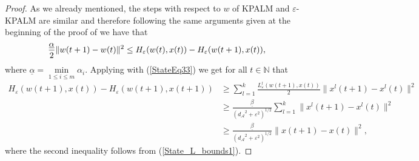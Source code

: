 \documentclass[11pt]{article}
\numberwithin{equation}{section}
\begin{document}
\begin{proof}
As we already mentioned, the steps with respect to $w$ of KPALM and $\varepsilon$-KPALM  are similar and therefore following the same arguments given at the beginning of the proof of  we have that
\begin{equation}
	\frac{\underline{\alpha}}{2} \|w(t+1) - w(t)\|^2 \leq H_{\varepsilon}(w(t),x(t)) - H_{\varepsilon}(w(t+1),x(t)) , \\ \label{StateEq37}
\end{equation}
where $\underline{\alpha} = \min\limits_{1 \leq i \leq m} \alpha_i $.
Applying  with (\ref{StateEq33}) we get for all $t \in \mathbb{N}$ that
\begin{align}
	H_{\varepsilon}(w(t+1),x(t)) - H_{\varepsilon}(w(t+1),x(t+1)) 
	&\geq \sum\limits_{l=1}^{k} \frac{L^l_{\varepsilon}(w(t+1),x(t))}{2} \|x^l(t+1)-x^l(t)\|^2 \\
	&\geq \frac{\underline{\beta}}{\left( {d_{\mathcal{A}}}^2 + {\varepsilon}^2 \right)^{1/2}} \sum\limits _{l=1}^{k} \|x^l(t+1)-x^l(t)\|^2 \\
	&\geq \frac{\underline{\beta}}{\left( {d_{\mathcal{A}}}^2 + {\varepsilon}^2 \right)^{1/2}} \|x(t+1)-x(t)\|^2 , \label{StateEq39}
\end{align}
where the second inequality follows from (\ref{State_L_bounds1}).
%

\end{proof}
\end{document}
